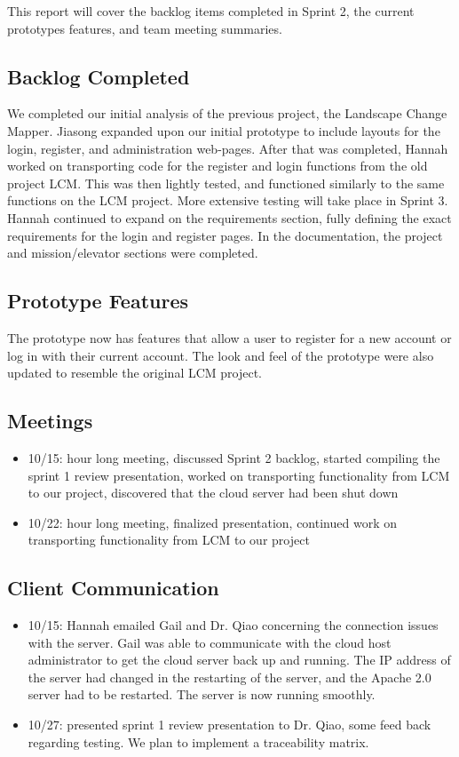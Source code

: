 
This report will cover the backlog items completed in Sprint 2, the current prototypes features, and team meeting summaries. 

 \subsection{Backlog Completed}
 We completed our initial analysis of the previous project, the Landscape Change Mapper. Jiasong expanded upon our initial prototype to include layouts for the login, register, and administration web-pages. After that was completed, Hannah worked on transporting code for the register and login functions from the old project LCM. This was then lightly tested, and functioned similarly to the same functions on the LCM project. More extensive testing will take place in Sprint 3. Hannah continued to expand on the requirements section, fully defining the exact requirements for the login and register pages. In the documentation, the project and mission/elevator sections were completed. 
 
 \subsection{Prototype Features}
 The prototype now has features that allow a user to register for a new account or log in with their current account. The look and feel of the prototype were also updated to resemble the original LCM project.
 
 \subsection{Meetings}
\begin{itemize}
\item10/15: hour long meeting, discussed Sprint 2 backlog, started compiling the sprint 1 review presentation, worked on transporting functionality from LCM to our project, discovered that the cloud server had been shut down
\item10/22: hour long meeting, finalized presentation, continued work on transporting functionality from LCM to our project
\end{itemize}

\subsection{Client Communication}
\begin{itemize}
\item10/15: Hannah emailed Gail and Dr. Qiao concerning the connection issues with the server. Gail was able to communicate with the cloud host administrator to get the cloud server back up and running. The IP address of the server had changed in the restarting of the server, and the Apache 2.0 server had to be restarted. The server is now running smoothly.
\item10/27: presented sprint 1 review presentation to Dr. Qiao, some feed back regarding testing. We plan to implement a traceability matrix.
\end{itemize}

